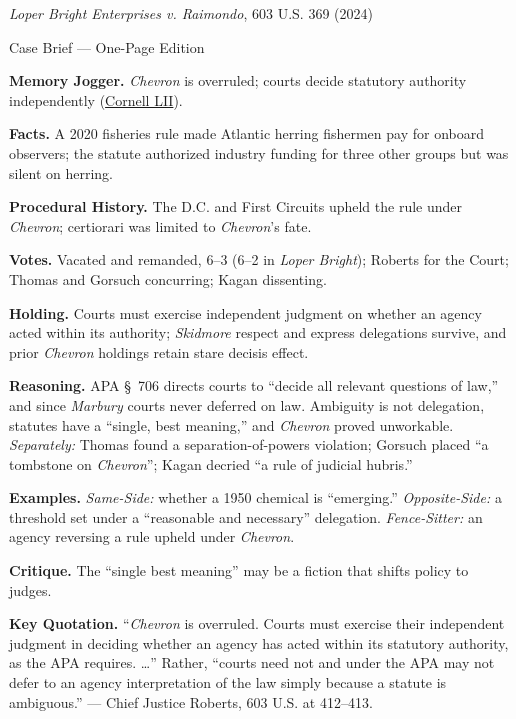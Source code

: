 \documentclass[12pt]{article}
\begin{document}
\begin{center}
{\Large \textit{Loper Bright Enterprises v. Raimondo}, 603 U.S. 369 (2024)\par}
\vspace{0.3em}
{\normalsize Case Brief --- One-Page Edition\par}
\end{center}

\textbf{Memory Jogger.} \textit{Chevron} is overruled; courts decide statutory authority independently (\href{https://www.law.cornell.edu/supremecourt/text/22-451}{Cornell LII}).

\textbf{Facts.} A 2020 fisheries rule made Atlantic herring fishermen pay for onboard observers; the statute authorized industry funding for three other groups but was silent on herring.

\textbf{Procedural History.} The D.C. and First Circuits upheld the rule under \textit{Chevron}; certiorari was limited to \textit{Chevron}'s fate.

\textbf{Votes.} Vacated and remanded, 6--3 (6--2 in \textit{Loper Bright}); Roberts for the Court; Thomas and Gorsuch concurring; Kagan dissenting.

\textbf{Holding.} Courts must exercise independent judgment on whether an agency acted within its authority; \textit{Skidmore} respect and express delegations survive, and prior \textit{Chevron} holdings retain stare decisis effect.

\textbf{Reasoning.} APA \S~706 directs courts to ``decide all relevant questions of law,'' and since \textit{Marbury} courts never deferred on law. Ambiguity is not delegation, statutes have a ``single, best meaning,'' and \textit{Chevron} proved unworkable. \emph{Separately:} Thomas found a separation-of-powers violation; Gorsuch placed ``a tombstone on \textit{Chevron}''; Kagan decried ``a rule of judicial hubris.''

\textbf{Examples.} \emph{Same-Side:} whether a 1950 chemical is ``emerging.'' \emph{Opposite-Side:} a threshold set under a ``reasonable and necessary'' delegation. \emph{Fence-Sitter:} an agency reversing a rule upheld under \textit{Chevron}.

\textbf{Critique.} The ``single best meaning'' may be a fiction that shifts policy to judges.

\textbf{Key Quotation.} ``\textit{Chevron} is overruled. Courts must exercise their independent judgment in deciding whether an agency has acted within its statutory authority, as the APA requires. \ldots{}'' Rather, ``courts need not and under the APA may not defer to an agency interpretation of the law simply because a statute is ambiguous.'' --- Chief Justice Roberts, 603 U.S. at 412--413.
\end{document}
